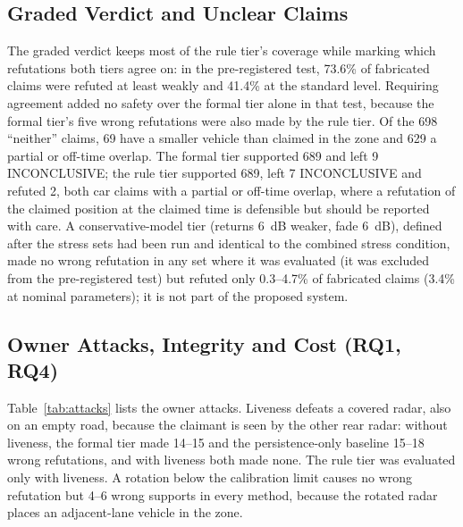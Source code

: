 \subsection{Graded Verdict and Unclear Claims}\label{sec:graded}
The graded verdict keeps most of the rule tier's coverage while marking which refutations both tiers agree on: in the pre-registered test, 73.6\% of fabricated claims were refuted at least weakly and 41.4\% at the standard level. Requiring agreement added no safety over the formal tier alone in that test, because the formal tier's five wrong refutations were also made by the rule tier. Of the 698 ``neither'' claims, 69 have a smaller vehicle than claimed in the zone and 629 a partial or off-time overlap. The formal tier supported 689 and left 9 INCONCLUSIVE; the rule tier supported 689, left 7 INCONCLUSIVE and refuted 2, both car claims with a partial or off-time overlap, where a refutation of the claimed position at the claimed time is defensible but should be reported with care. A conservative-model tier (returns 6~dB weaker, fade 6~dB), defined after the stress sets had been run and identical to the combined stress condition, made no wrong refutation in any set where it was evaluated (it was excluded from the pre-registered test) but refuted only 0.3--4.7\% of fabricated claims (3.4\% at nominal parameters); it is not part of the proposed system.

\subsection{Owner Attacks, Integrity and Cost (RQ1, RQ4)}\label{sec:attacks}
Table~\ref{tab:attacks} lists the owner attacks. Liveness defeats a covered radar, also on an empty road, because the claimant is seen by the other rear radar: without liveness, the formal tier made 14--15 and the persistence-only baseline 15--18 wrong refutations, and with liveness both made none. The rule tier was evaluated only with liveness. A rotation below the calibration limit causes no wrong refutation but 4--6 wrong supports in every method, because the rotated radar places an adjacent-lane vehicle in the zone.

